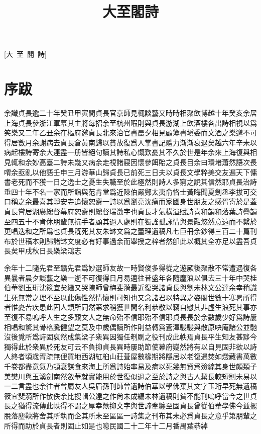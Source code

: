 \documentclass{zhvt-classic-Miya}
\title{大至閣詩}
\begin{document}
	
	[大~至~閣~詩]
	
	\cleardoublepage
	
	\setcounter{page}{1}
	\tableofcontents
	
	\mainmatter


\chapter*{序跋}
余識貞長逾二十年癸丑甲寅間貞長官京師見輒談藝又時時相聚飲博越十年癸亥余居上海貞長參浙江軍幕其主將每招余至杭州暇則與貞長游湖上飲酒樓各出詩相視以爲笑樂又二年乙丑余在樞府邀貞長北來治官書晨夕相見顧簿書塡委而文酒之樂邈不可得居數月余謝病去貞長倉黃南歸以貧故復爲人掌書記體力渐渐衰退矣越六年辛未以病起樓詩寄余大連盡一册皆絕句讀其詩私心慨歎憂其不久於世是年余來上海復與相見輒和余妙高臺二詩未幾又病余走視諸寢因懷參餌貽之貞長目余曰環堵蕭然語次長喟余亟亂以他語壬申三月游華山歸貞長已前死三日夫以貞長文學粹美交友遍天下傭書老死而不獲一日之逸士之憂生失職至於此極然則詩人多窮之說其信然耶貞長治詩垂四十年不名一家而所詣與范肯堂爲近陳伯嚴鄭太夷俞恪士黃晦聞夏劍丞李拔可交口稱之余最喜其靜安寺追懷恕齋一詩以爲瀏亮沈痛而家國身世朋友之感胥寄於是蓋貞長嘗居湖廣總督幕府恕齋則總督瑞澂字也貞長才氣橫溢賦詩喜和韻和落葉詩疊韻至四五十不肯休朋輩無抗手者顧其過人處則在獨謠孤詠情與景融悠然意遠而不繫於更唱迭和之所爲也貞長旣死其友朱缽文爲之董理遺稿凡七巨冊余鈔得三百二十篇刊布於世稿本則歸諸缽文度必有好事過余而舉授之梓者然卽此以概其全亦足以盡吾貞長矣甲戌秋日長樂梁鴻志
\begin{fw}\end{fw}
余年十二隨先君至贛先君爲妙選師友故一時賢俊多得從之遊厥後聚散不常遭遇復各異曩者晨夕談藝之樂一逝不可復得日月易邁往昔盛年各隨塵浪以俱去三十年中哭桂伯華劉玉珩沈筱宜矣繼又哭陳師曾梅斐漪最近復哭諸貞長與劉未林文公達余幸稍識生死無常之理不至以此傷性然情懷則可知也又念諸君以特異之姿閱世數十寒暑所得者惟憂苦疾患此固人類所同然第求稍獲世間名利恭敬以竊自慰其非虛生浪死其事亦至復不易嗚呼人生之多艱文人之無命殆不信耶殆不信耶貞長長於余數歲少好爲詩屢相唱和驚其骨格騰健望之莫及中歲偶讀所作則益轉爲蒼渾駸駸與散原吷庵諸公並馳沒後覓所爲詩固裒然成集梁子衆異因獨任剞劂之役刊成此帙焉貞長平生知友甚黟今獨得此於衆異於死友可云不負抑貞長異時屢助節使幕府嶷然將有以自見固非欲以詩人終者頃歲胥疏無俚買地西湖紅桕山莊葺屋數椽期將隱居以老復遇焚如燬藏書萬數千卷都盡意氣乃頓衰謀食來海上所爲詩始率易及病以死幾無貲爲殮綜其身世頗類子美樊川與玉溪劍南然斂華就實能用於世復似過之至於詩之與古人絜長較短則未易以一二言盡也余往者曾屬友人吳眉孫刊師曾遺詩伯華以學佛棄其文字玉珩早死無遺稿筱宜斐漪所作散佚余比搜輯公達之作尙未成編未林遺稿則貧不能刊嗚呼當今之世貞長之猶得流傳此帙得不謂之厚幸歟抑文字與世諦牽纏至固貞長曾從伯華學佛今兹擺脫落塵鞅將舍其所執而企其所未至區區一詩集之刊布其未必爲貞長之意乎第朋輩之所得而助於貞長者則固止如是也噫民國二十二年十二月番禺葉恭綽
\end{document}
